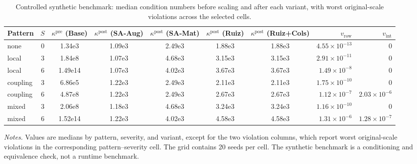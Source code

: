 \documentclass[AMA,Times1COL]{WileyNJDv5} %
\newcommand{\methodAug}{SA-Aug}
\newcommand{\methodMat}{SA-Mat}
\newcommand{\methodRuiz}{Ruiz}
\newcommand{\methodRuizCols}{Ruiz+Cols}
\providecommand{\DIFaddbegin}{} %
\providecommand{\DIFaddend}{} %
\providecommand{\DIFdelend}{} %
\begin{document}
\DIFdelend \DIFaddbegin \begin{table}[t]
\centering
\scriptsize
\caption{Controlled synthetic benchmark: median condition numbers before scaling and after each variant, with worst original-scale violations across the selected cells.}
\label{tab:synthetic_compact}
\begin{tabular}{@{}l c
  S[table-format=1.2e2] S[table-format=1.2e2] S[table-format=1.2e2]
  S[table-format=1.2e2] S[table-format=1.2e2] r r@{}}
\toprule
Pattern & {$S$} & {$\kappa^{\mathrm{pre}}$ (Base)} & {$\kappa^{\mathrm{post}}$ (\methodAug)} & {$\kappa^{\mathrm{post}}$ (\methodMat)} & {$\kappa^{\mathrm{post}}$ (\methodRuiz)} & {$\kappa^{\mathrm{post}}$ (\methodRuizCols)} & {$v_{\mathrm{row}}$} & {$v_{\mathrm{int}}$} \\
\midrule
none & 0 & 1.34e3 & 1.09e3 & 2.49e3 & 1.88e3 & 1.88e3 & $4.55\times10^{-13}$ & $0$ \\
\addlinespace
local & 3 & 1.84e8 & 1.07e3 & 4.68e3 & 3.15e3 & 3.15e3 & $2.91\times10^{-11}$ & $0$ \\
local & 6 & 1.49e14 & 1.07e3 & 4.02e3 & 3.67e3 & 3.67e3 & $1.49\times10^{-8}$ & $0$ \\
\addlinespace
coupling & 3 & 6.86e5 & 1.22e3 & 2.49e3 & 2.11e3 & 2.11e3 & $1.75\times10^{-10}$ & $0$ \\
coupling & 6 & 4.87e8 & 1.22e3 & 2.49e3 & 2.67e3 & 2.67e3 & $1.12\times10^{-7}$ & $2.03\times10^{-6}$ \\
\addlinespace
mixed & 3 & 2.06e8 & 1.18e3 & 4.68e3 & 3.24e3 & 3.24e3 & $1.16\times10^{-10}$ & $0$ \\
mixed & 6 & 1.52e14 & 1.22e3 & 4.02e3 & 4.58e3 & 4.58e3 & $1.31\times10^{-6}$ & $1.28\times10^{-7}$ \\
\bottomrule
\end{tabular}
\begin{flushleft}\footnotesize
\emph{Notes.} Values are medians by pattern, severity, and variant, except for the two
violation columns, which report worst original-scale violations in the corresponding
pattern--severity cell. The grid contains 20 seeds per cell. The synthetic benchmark is a
conditioning and equivalence check, not a runtime benchmark.
\end{flushleft}
\end{table}
\DIFaddend 
\end{document}
